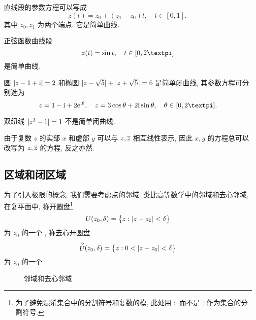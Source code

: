 \begin{exampleenum}
  \item 直线段的参数方程可以写成
  \[
    z(t)=z_0+(z_1-z_0)t,\quad t\in[0,1],
  \]
  其中 $z_0,z_1$ 为两个端点.
  它是简单曲线.
  \item 正弦函数曲线段
  \[
    z(t)=\sin t,\quad t\in[0,2\cpi]
  \]
  是简单曲线.
  \item 圆 $\lvert z-1+\mathrm{i}\rvert=2$ 和椭圆 $\lvert z-\sqrt5\rvert+\lvert z+\sqrt5\rvert=6$ 是简单闭曲线, 其参数方程可分别选为
  \[
    z=1-\ii+2\ee^{\ii\theta},\quad
    z=3\cos\theta+2\ii\sin\theta,\quad
    \theta\in[0,2\cpi].
  \]
  \item 双纽线 $\lvert z^2-1\rvert=1$ 不是简单闭曲线.
\end{exampleenum}

由于复数 $z$ 的实部 $x$ 和虚部 $y$ 可以与 $z,\overline z$ 相互线性表示, 因此 $x,y$ 的方程总可以改写为 $z,\overline z$ 的方程, 反之亦然.


\subsection{区域和闭区域}

为了引入极限的概念, 我们需要考虑点的邻域.
类比高等数学中的邻域和去心邻域, 在复平面中, 称开圆盘\footnote{%
  为了避免混淆集合中的分割符号和复数的模, 此处用 $:$ 而不是 $\mid$ 作为集合的分割符号.%
}
\[
  U(z_0,\delta)=\bigl\{z\mathrel{:} \lvert z-z_0\rvert<\delta\bigr\}
\]
为 $z_0$ 的一个 , 称去心开圆盘
\[
  \stackrel{\circ}{U}\!\!(z_0,\delta)=\bigl\{z\mathrel{:} 0<\lvert z-z_0\rvert<\delta\bigr\}
\]
为 $z_0$ 的一个.

\begin{figure}[H]
  \centering
  \begin{minipage}{.4\textwidth}
    \centering
  \end{minipage}
  \begin{minipage}{.4\textwidth}
    \centering
  \end{minipage}
  \caption{邻域和去心邻域}
\end{figure}

